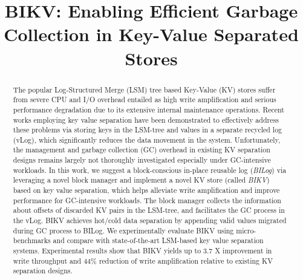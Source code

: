 \documentclass[sigconf]{acmart}
\begin{document}
	
\title{BIKV: Enabling Efficient Garbage Collection in Key-Value Separated Stores}

\iffalse
\author{Huifen Chan}
\affiliation{%
	\institution{Tsinghua University}
	\streetaddress{30 Shuangqing Rd}
	\city{Haidian Qu}
	\state{Beijing Shi}
	\country{China}}
\email{cpalmer@prl.com}
\fi

\begin{abstract}
The popular Log-Structured Merge (LSM) tree based Key-Value (KV) stores suffer from severe CPU and I/O overhead entailed as high write amplification and serious performance degradation due to its extensive internal maintenance operations. Recent works employing key value separation have been demonstrated to effectively address these problems via storing keys in the LSM-tree and values in a separate recycled log (vLog), which significantly reduces the data movement in the system.  Unfortunately, the management and garbage collection (GC) overhead in existing  KV separation designs remains largely not thoroughly investigated especially under GC-intensive workloads. In this work, we suggest a block-conscious in-place reusable log ({\it{BILog}}) via leveraging a novel block manager and implement a novel KV store (called {\it{BIKV}}) based on key value separation, which helps alleviate write amplification and improve performance for GC-intensive workloads. The block manager collects the information about offsets of discarded KV pairs in the LSM-tree, {\color{black}{manages these offsets in blocks}} and facilitates the GC process in the vLog. BIKV achieves hot/cold data separation by appending valid values migrated during GC process to BILog. We experimentally evaluate BIKV using micro-benchmarks and compare with state-of-the-art LSM-based key value separation systems. Experimental results show that BIKV yields up to 3.7 X improvement in write throughput and 44\% reduction of write amplification relative to existing KV separation designs. 


\end{abstract}
\end{document}
